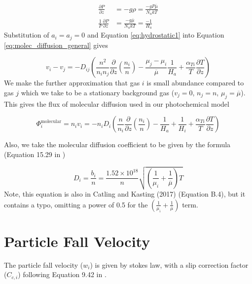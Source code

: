 \documentclass{article}
\begin{document}
\begin{align} 
  \frac{\partial P}{\partial z} &= -g \rho = \frac{-g P \overline{\mu}}{N_a k T} \\
  \frac{1}{P}\frac{\partial P}{\partial z} &= \frac{-g \overline{\mu}}{N_a k T} = \frac{-1}{H_a} \label{eq:hydrostatic1}
\end{align}
Substitution of $a_i = a_j = 0$ and Equation \eqref{eq:hydrostatic1} into Equation \eqref{eq:molec_diffusion_general} gives

\begin{equation} \label{eq:molec_diffusion_simplify1}
  v_i - v_j = -D_{ij} \left( \frac{n^2}{n_i n_j} \frac{\partial}{\partial z} \left(\frac{n_i}{n}\right) - \frac{\mu_j - \mu_i}{\overline{\mu}} \frac{1}{H_a} + \frac{\alpha_{Ti}}{T} \frac{\partial T}{\partial z} \right)
\end{equation}
We make the further approximation that gas $i$ is small abundance compared to gas $j$ which we take to be a stationary background gas ($v_j = 0$, $n_j = n$, $\mu_j = \overline{\mu}$). This gives the flux of molecular diffusion used in our photochemical model

\begin{equation} \label{eq:phi_molec_diffusion}
  \Phi_i^\text{molecular} = n_i v_i = -n_i D_{i} \left( \frac{n}{n_i} \frac{\partial}{\partial z} \left(\frac{n_i}{n}\right) - \frac{1}{H_a} + \frac{1}{H_i} + \frac{\alpha_{Ti}}{T} \frac{\partial T}{\partial z} \right)
\end{equation}

Also, we take the molecular diffusion coefficient to be given by the formula (Equation 15.29 in \cite{Banks_2013})

\begin{equation} \label{eq:molec_diffusion_coeff}
  D_i = 
  \frac{b_i}{n} = \frac{1.52 \times 10^{18}}{n} \sqrt{\left( \frac{1}{\mu_i} + \frac{1}{\overline{\mu}} \right) T}
\end{equation}
Note, this equation is also in Catling and Kasting (2017) \cite{Catling_2017} (Equation B.4), but it contains a typo, omitting a power of 0.5 for the $\left( \frac{1}{\mu_i} + \frac{1}{\overline{\mu}} \right)$ term.

\section{Particle Fall Velocity} \label{sec:fall_velocity}

The particle fall velocity ($w_i$) is given by stokes law, with a slip correction factor ($C_{c,i}$) following Equation 9.42 in \cite{Seinfeld_2006}.
\end{document}
